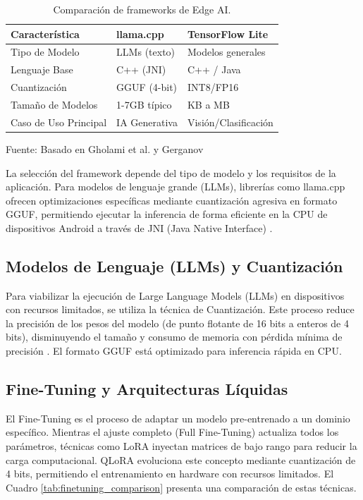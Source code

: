 \begin{table}[H]
\centering
\begin{tabularx}{\linewidth}{p{3.5cm} p{4.5cm} p{4.5cm}}
\toprule
Característica & llama.cpp & TensorFlow Lite \\
\midrule
Tipo de Modelo & LLMs (texto) & Modelos generales \\
Lenguaje Base & C++ (JNI) & C++ / Java \\
Cuantización & GGUF (4-bit) & INT8/FP16 \\
Tamaño de Modelos & 1-7GB típico & KB a MB \\
Caso de Uso Principal & IA Generativa & Visión/Clasificación \\
\bottomrule
\end{tabularx}
\caption{Comparación de frameworks de Edge AI.}\label{tab:edge_frameworks}
Fuente: Basado en Gholami et al. \cite{quantization_papers} y Gerganov \cite{llama_cpp}
\end{table}

La selección del framework depende del tipo de modelo y los requisitos de la aplicación. Para modelos de lenguaje grande (LLMs), librerías como llama.cpp ofrecen optimizaciones específicas mediante cuantización agresiva en formato GGUF, permitiendo ejecutar la inferencia de forma eficiente en la CPU de dispositivos Android a través de JNI (Java Native Interface) \cite{llama_cpp}.

\subsection{Modelos de Lenguaje (LLMs) y Cuantización}
Para viabilizar la ejecución de Large Language Models (LLMs) en dispositivos con recursos limitados, se utiliza la técnica de Cuantización. Este proceso reduce la precisión de los pesos del modelo (de punto flotante de 16 bits a enteros de 4 bits), disminuyendo el tamaño y consumo de memoria con pérdida mínima de precisión \cite{quantization_papers}. El formato GGUF está optimizado para inferencia rápida en CPU.

\subsection{Fine-Tuning y Arquitecturas Líquidas}
El Fine-Tuning es el proceso de adaptar un modelo pre-entrenado a un dominio específico. Mientras el ajuste completo (Full Fine-Tuning) actualiza todos los parámetros, técnicas como LoRA inyectan matrices de bajo rango para reducir la carga computacional. QLoRA evoluciona este concepto mediante cuantización de 4 bits, permitiendo el entrenamiento en hardware con recursos limitados. El Cuadro \ref{tab:finetuning_comparison} presenta una comparación de estas técnicas.

